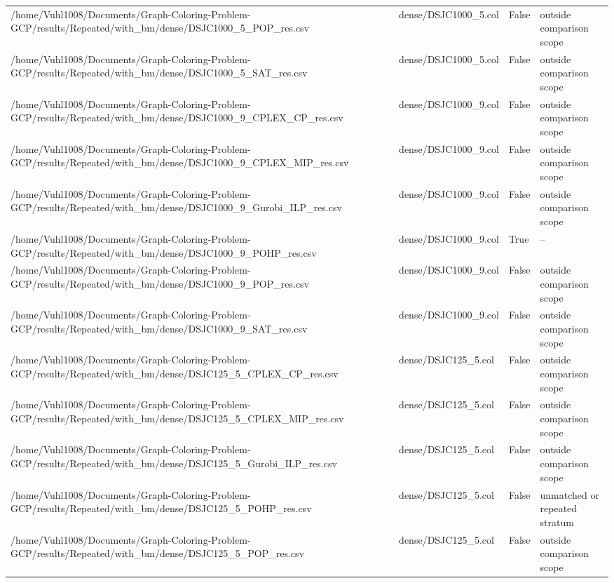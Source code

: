 \begin{table}[htbp]
\begin{tabular}{llll}
/home/Vuhl1008/Documents/Graph-Coloring-Problem-GCP/results/Repeated/with\_bm/dense/DSJC1000\_5\_POP\_res.csv & dense/DSJC1000\_5.col & False & outside comparison scope \\
/home/Vuhl1008/Documents/Graph-Coloring-Problem-GCP/results/Repeated/with\_bm/dense/DSJC1000\_5\_SAT\_res.csv & dense/DSJC1000\_5.col & False & outside comparison scope \\
/home/Vuhl1008/Documents/Graph-Coloring-Problem-GCP/results/Repeated/with\_bm/dense/DSJC1000\_9\_CPLEX\_CP\_res.csv & dense/DSJC1000\_9.col & False & outside comparison scope \\
/home/Vuhl1008/Documents/Graph-Coloring-Problem-GCP/results/Repeated/with\_bm/dense/DSJC1000\_9\_CPLEX\_MIP\_res.csv & dense/DSJC1000\_9.col & False & outside comparison scope \\
/home/Vuhl1008/Documents/Graph-Coloring-Problem-GCP/results/Repeated/with\_bm/dense/DSJC1000\_9\_Gurobi\_ILP\_res.csv & dense/DSJC1000\_9.col & False & outside comparison scope \\
/home/Vuhl1008/Documents/Graph-Coloring-Problem-GCP/results/Repeated/with\_bm/dense/DSJC1000\_9\_POHP\_res.csv & dense/DSJC1000\_9.col & True & -- \\
/home/Vuhl1008/Documents/Graph-Coloring-Problem-GCP/results/Repeated/with\_bm/dense/DSJC1000\_9\_POP\_res.csv & dense/DSJC1000\_9.col & False & outside comparison scope \\
/home/Vuhl1008/Documents/Graph-Coloring-Problem-GCP/results/Repeated/with\_bm/dense/DSJC1000\_9\_SAT\_res.csv & dense/DSJC1000\_9.col & False & outside comparison scope \\
/home/Vuhl1008/Documents/Graph-Coloring-Problem-GCP/results/Repeated/with\_bm/dense/DSJC125\_5\_CPLEX\_CP\_res.csv & dense/DSJC125\_5.col & False & outside comparison scope \\
/home/Vuhl1008/Documents/Graph-Coloring-Problem-GCP/results/Repeated/with\_bm/dense/DSJC125\_5\_CPLEX\_MIP\_res.csv & dense/DSJC125\_5.col & False & outside comparison scope \\
/home/Vuhl1008/Documents/Graph-Coloring-Problem-GCP/results/Repeated/with\_bm/dense/DSJC125\_5\_Gurobi\_ILP\_res.csv & dense/DSJC125\_5.col & False & outside comparison scope \\
/home/Vuhl1008/Documents/Graph-Coloring-Problem-GCP/results/Repeated/with\_bm/dense/DSJC125\_5\_POHP\_res.csv & dense/DSJC125\_5.col & False & unmatched or repeated stratum \\
/home/Vuhl1008/Documents/Graph-Coloring-Problem-GCP/results/Repeated/with\_bm/dense/DSJC125\_5\_POP\_res.csv & dense/DSJC125\_5.col & False & outside comparison scope \\

\end{tabular}
\end{table}
